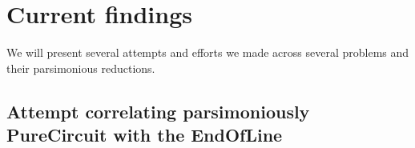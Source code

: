 
\section{Current findings}                               
\label{sec:findings}
We will present several attempts and efforts we made across several problems and their
parsimonious reductions.

\subsection{Attempt correlating parsimoniously PureCircuit with the EndOfLine}

